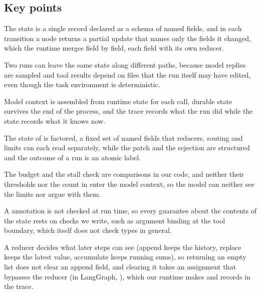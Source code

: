 \subsection*{Key points}
\bi
\item The state is a single record declared as a schema of named fields, and in each transition a
node returns a partial update that names only the fields it changed, which the runtime merges field
by field, each field with its own reducer.
\item Two runs can leave the same state along different paths, because model replies are sampled and
tool results depend on files that the run itself may have edited, even though the task environment
is deterministic.
\item Model context is assembled from runtime state for each call, durable state survives the end
of the process, and the trace records what the run did while the state records what it knows now.
\item The state of \msa{} is factored, a fixed set of named fields that reducers, routing and limits
can each read separately, while the patch and the rejection are structured and the outcome of a run
is an atomic label.
\item The budget and the stall check are comparisons in our code, and neither their thresholds nor
the count in  enter the model context, so the model can neither see the limits
nor argue with them.
\item A  annotation is not checked at run time, so every guarantee about the
contents of the state rests on checks we write, such as argument binding at the tool boundary, which
itself does not check types in general.
\item A reducer decides what later steps can see (append keeps the history, replace keeps the latest
value, accumulate keeps running sums), so returning an empty list does not clear an append field,
and clearing it takes an assignment that bypasses the reducer (in LangGraph,
), which our runtime makes and records in the trace.
\ei
